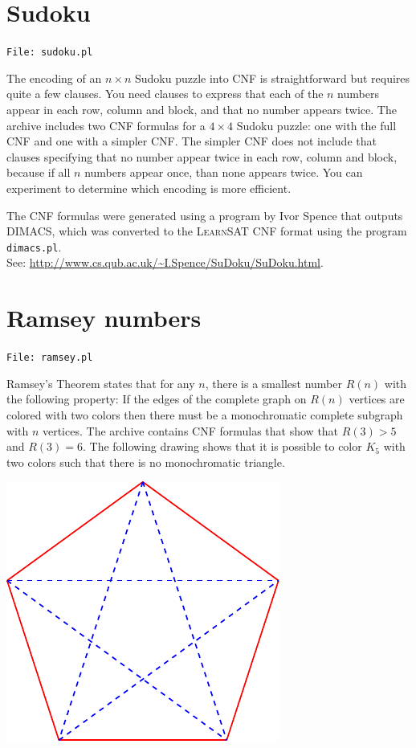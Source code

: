 \documentclass[11pt]{report}
\newcommand*{\p}[1]{\textup{\texttt{#1}}}
\newcommand*{\ls}{\textsc{LearnSAT}}
\newcommand*{\fl}[1]{\parbox{\textwidth}{\raggedleft \p{File: #1}}}
\begin{document}

\section{Sudoku}

\fl{sudoku.pl}

The encoding of an $n\times n$ Sudoku puzzle into CNF is straightforward but requires quite a few clauses. You need clauses to express that each of the $n$ numbers appear in each row, column and block, and that no number appears twice. The archive includes two CNF formulas for a $4\times 4$ Sudoku puzzle: one with the full CNF and one with a simpler CNF. The simpler CNF does not include that clauses specifying that no number appear twice in each row, column and block, because if all $n$ numbers appear once, than none appears twice. You can experiment to determine which encoding is more efficient.

The CNF formulas were generated using a program by Ivor Spence that outputs DIMACS, which was converted to the \ls{} CNF format using the program \p{dimacs.pl}.\\
See: \url{http://www.cs.qub.ac.uk/~I.Spence/SuDoku/SuDoku.html}.

\clearpage


\section{Ramsey numbers}

\fl{ramsey.pl}

Ramsey's Theorem states that for any $n$, there is a smallest number $R(n)$ with the following property: If the edges of the complete graph on $R(n)$ vertices are colored with two colors then there must be a monochromatic complete subgraph with $n$ vertices. The archive contains CNF formulas that show that $R(3)>5$ and $R(3) = 6$. The following drawing shows that it is possible to color $K_5$ with two colors such that there is no monochromatic triangle.


\begin{center}
\includegraphics{ramsey.pdf}
\end{center}
\end{document}
